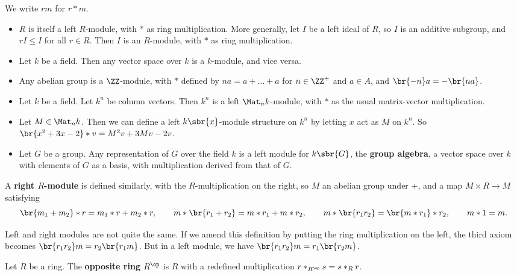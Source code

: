 We write $ rm $ for $ r * m $.

\begin{example*}
\hfill
\begin{itemize}
\item $ R $ is itself a left $ R $-module, with $ * $ as ring multiplication. More generally, let $ I $ be a left ideal of $ R $, so $ I $ is an additive subgroup, and $ rI \le I $ for all $ r \in R $. Then $ I $ is an $ R $-module, with $ * $ as ring multiplication.
\item Let $ k $ be a field. Then any vector space over $ k $ is a $ k $-module, and vice versa.
\item Any abelian group is a $ \ZZ $-module, with $ * $ defined by $ na = a + \dots + a $ for $ n \in \ZZ^+ $ and $ a \in A $, and $ \br{-n}a = -\br{na} $.
\item Let $ k $ be a field. Let $ k^n $ be column vectors. Then $ k^n $ is a left $ \Mat_n k $-module, with $ * $ as the usual matrix-vector multiplication.
\item Let $ M \in \Mat_n k $. Then we can define a left $ k\sbr{x} $-module structure on $ k^n $ by letting $ x $ act as $ M $ on $ k^n $. So $ \br{x^2 + 3x - 2} * v = M^2v + 3Mv - 2v $.
\item Let $ G $ be a group. Any representation of $ G $ over the field $ k $ is a left module for $ k\sbr{G} $, the \textbf{group algebra}, a vector space over $ k $ with elements of $ G $ as a basis, with multiplication derived from that of $ G $.
\end{itemize}
\end{example*}

\begin{definition}
A \textbf{right $ R $-module} is defined similarly, with the $ R $-multiplication on the right, so $ M $ an abelian group under $ + $, and a map $ M \times R \to M $ satisfying
$$ \br{m_1 + m_2} * r = m_1 * r + m_2 * r, \qquad m * \br{r_1 + r_2} = m * r_1 + m * r_2, \qquad m * \br{r_1r_2} = \br{m * r_1} * r_2, \qquad m * 1 = m. $$
\end{definition}

Left and right modules are not quite the same. If we amend this definition by putting the ring multiplication on the left, the third axiom becomes $ \br{r_1r_2}m = r_2\br{r_1m} $. But in a left module, we have $ \br{r_1r_2}m = r_1\br{r_2m} $.

\begin{definition}
Let $ R $ be a ring. The \textbf{opposite ring} $ R^{\op} $ is $ R $ with a redefined multiplication $ r *_{R^{\op}} s = s *_R r $.
\end{definition}

